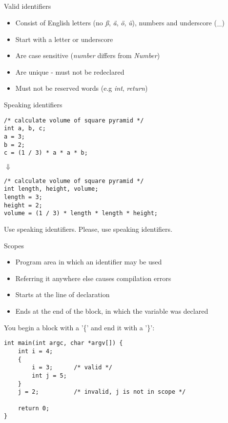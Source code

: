 \subsection{}
\begin{frame}{Valid identifiers}
	\begin{itemize}
		\item Consist of English letters (no \textit{ß}, \textit{ä}, \textit{ö}, \textit{ü}), numbers and underscore (\_)
		\item Start with a letter or underscore
		\item Are case sensitive (\textit{number} differs from \textit{Number})
		\item Are unique - must not be redeclared
		\item Must not be reserved words (e.g \textit{int}, \textit{return})
	\end{itemize}
\end{frame}
\begin{frame}[fragile]{Speaking identifiers}
	\begin{lstlisting}
/* calculate volume of square pyramid */
int a, b, c;
a = 3;
b = 2;
c = (1 / 3) * a * a * b;
\end{lstlisting}
\centering
$\Downarrow$
	\begin{lstlisting}
/* calculate volume of square pyramid */
int length, height, volume;
length = 3;
height = 2;
volume = (1 / 3) * length * length * height;
\end{lstlisting}
\end{frame}
\begin{frame}{Use speaking identifiers.}
	\LARGE
	\centering
	Please, use speaking identifiers.\footnotemark
	
\end{frame}
\begin{frame}[fragile]{Scopes}
	\begin{itemize}
		\item Program area in which an identifier may be used
		\item Referring it anywhere else causes compilation errors
		\item Starts at the line of declaration
		\item Ends at the end of the block, in which the variable was declared
	\end{itemize}
	You begin a block with a '\{' and end it with a '\}':
	\begin{lstlisting}
int main(int argc, char *argv[]) {
	int i = 4;
	{
		i = 3;		/* valid */
		int j = 5;
	}
	j = 2;			/* invalid, j is not in scope */
	
	return 0;
}
\end{lstlisting}
\end{frame}
